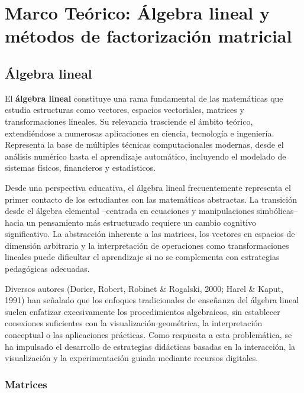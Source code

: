  \chapter{Marco Teórico: Álgebra lineal y métodos de factorización matricial}
 \label{MarcoTeorico}

\section{Álgebra lineal}

\noindent El \textbf{álgebra lineal} constituye una rama fundamental de las matemáticas que estudia estructuras como vectores, espacios vectoriales, matrices y transformaciones lineales. Su relevancia trasciende el ámbito teórico, extendiéndose a numerosas aplicaciones en ciencia, tecnología e ingeniería. Representa la base de múltiples técnicas computacionales modernas, desde el análisis numérico hasta el aprendizaje automático, incluyendo el modelado de sistemas físicos, financieros y estadísticos.

Desde una perspectiva educativa, el álgebra lineal frecuentemente representa el primer contacto de los estudiantes con las matemáticas abstractas. La transición desde el álgebra elemental --centrada en ecuaciones y manipulaciones simbólicas-- hacia un pensamiento más estructurado requiere un cambio cognitivo significativo. La abstracción inherente a las matrices, los vectores en espacios de dimensión arbitraria y la interpretación de operaciones como transformaciones lineales puede dificultar el aprendizaje si no se complementa con estrategias pedagógicas adecuadas.

Diversos autores (Dorier, Robert, Robinet \& Rogalski, 2000; Harel \& Kaput, 1991) han señalado que los enfoques tradicionales de enseñanza del álgebra lineal suelen enfatizar excesivamente los procedimientos algebraicos, sin establecer conexiones suficientes con la visualización geométrica, la interpretación conceptual o las aplicaciones prácticas. Como respuesta a esta problemática, se ha impulsado el desarrollo de estrategias didácticas basadas en la interacción, la visualización y la experimentación guiada mediante recursos digitales.

\subsection{Matrices}

